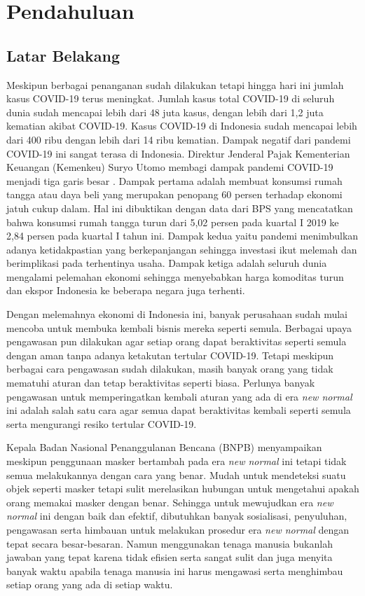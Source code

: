 \documentclass{article}
\begin{document}
  \section{Pendahuluan} 
  	\subsection{Latar Belakang}
	  	Meskipun berbagai penanganan sudah dilakukan tetapi hingga hari ini jumlah kasus COVID-19 terus meningkat. Jumlah kasus total COVID-19 di seluruh dunia sudah mencapai lebih dari 48 juta kasus, dengan lebih dari 1,2 juta kematian akibat COVID-19. Kasus COVID-19 di Indonesia sudah mencapai lebih dari 400 ribu dengan lebih dari 14 ribu kematian. Dampak negatif dari pandemi COVID-19 ini sangat terasa di Indonesia. Direktur Jenderal Pajak Kementerian Keuangan (Kemenkeu) Suryo Utomo membagi dampak pandemi COVID-19 menjadi tiga garis besar \cite{zuraya}. Dampak pertama adalah membuat konsumsi rumah tangga atau daya beli yang merupakan penopang 60 persen terhadap ekonomi jatuh cukup dalam. Hal ini dibuktikan dengan data dari BPS yang mencatatkan bahwa konsumsi rumah tangga turun dari 5,02 persen pada kuartal I 2019 ke 2,84 persen pada kuartal I tahun ini. Dampak kedua yaitu pandemi menimbulkan adanya ketidakpastian yang berkepanjangan sehingga investasi ikut melemah dan berimplikasi pada terhentinya usaha. Dampak ketiga adalah seluruh dunia mengalami pelemahan ekonomi sehingga menyebabkan harga komoditas turun dan ekspor Indonesia ke beberapa negara juga terhenti.
	  	
	  	\par Dengan melemahnya ekonomi di Indonesia ini, banyak perusahaan sudah mulai mencoba untuk membuka kembali bisnis mereka seperti semula. Berbagai upaya pengawasan pun dilakukan agar setiap orang dapat beraktivitas seperti semula dengan aman tanpa adanya ketakutan tertular COVID-19. Tetapi meskipun berbagai cara pengawasan sudah dilakukan, masih banyak orang yang tidak mematuhi aturan dan tetap beraktivitas seperti biasa. Perlunya banyak pengawasan untuk memperingatkan kembali aturan yang ada di era \textit{new normal} ini adalah salah satu cara agar semua dapat beraktivitas kembali seperti semula serta mengurangi resiko tertular COVID-19.
	  	
		\par Kepala Badan Nasional Penanggulanan Bencana (BNPB) menyampaikan meskipun penggunaan masker bertambah pada era \textit{new normal} ini tetapi tidak semua melakukannya dengan cara yang benar\cite{angga}. Mudah untuk mendeteksi suatu objek seperti masker tetapi sulit merelasikan hubungan untuk mengetahui apakah orang memakai masker dengan benar. Sehingga untuk mewujudkan era \textit{new normal} ini dengan baik dan efektif, dibutuhkan banyak sosialisasi, penyuluhan, pengawasan serta himbauan untuk melakukan prosedur era \textit{new normal} dengan tepat secara besar-besaran. Namun menggunakan tenaga manusia bukanlah jawaban yang tepat karena tidak efisien serta sangat sulit dan juga menyita banyak waktu apabila tenaga manusia ini harus mengawasi serta menghimbau setiap orang yang ada di setiap waktu.
		
\end{document}
